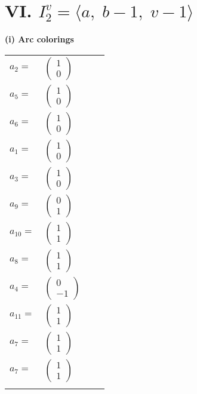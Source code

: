 \documentclass[1p]{elsarticle_modified}
\theoremstyle{definition}
\begin{document}
\centering \section*{VI. $I^v_{2}= \langle a,\;b-1,\;v-1 \rangle$}
\flushleft \textbf{(i) Arc colorings}\\
\begin{tabular}{m{7pt} m{180pt} m{7pt} m{180pt} }
\flushright $a_{2}=$&$\begin{pmatrix}1\\0\end{pmatrix}$ \\
\flushright $a_{5}=$&$\begin{pmatrix}1\\0\end{pmatrix}$ \\
\flushright $a_{6}=$&$\begin{pmatrix}1\\0\end{pmatrix}$ \\
\flushright $a_{1}=$&$\begin{pmatrix}1\\0\end{pmatrix}$ \\
\flushright $a_{3}=$&$\begin{pmatrix}1\\0\end{pmatrix}$ \\
\flushright $a_{9}=$&$\begin{pmatrix}0\\1\end{pmatrix}$ \\
\flushright $a_{10}=$&$\begin{pmatrix}1\\1\end{pmatrix}$ \\
\flushright $a_{8}=$&$\begin{pmatrix}1\\1\end{pmatrix}$ \\
\flushright $a_{4}=$&$\begin{pmatrix}0\\-1\end{pmatrix}$ \\
\flushright $a_{11}=$&$\begin{pmatrix}1\\1\end{pmatrix}$ \\
\flushright $a_{7}=$&$\begin{pmatrix}1\\1\end{pmatrix}$\\ \flushright $a_{7}=$&$\begin{pmatrix}1\\1\end{pmatrix}$\\&\end{tabular}
\end{document}
